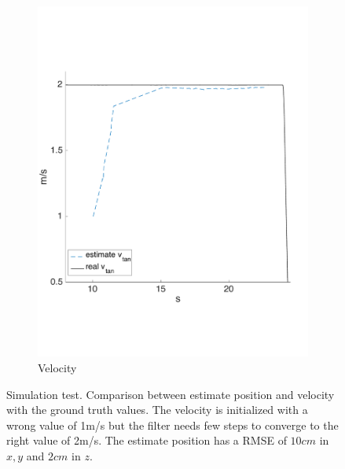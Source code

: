 \begin{figure}[!htbp]
\begin{subfigure}[b]{0.45\textwidth}
        \includegraphics[width=\textwidth]{img/tag_2ms_simulation_vel.pdf}
        \caption{Velocity}
        \label{fig:two_ekf_simulation_2ms}
   \end{subfigure}
  \caption{Simulation test. Comparison between estimate position and velocity with the ground truth values. The velocity is initialized with a wrong value of 1m/s but the filter needs few steps to converge to the right value of 2m/s. The estimate position has a RMSE of $10cm$ in $x,y$ and $2cm$ in $z$.}
  \label{fig:ekf_simulation_2ms}
\end{figure} 



